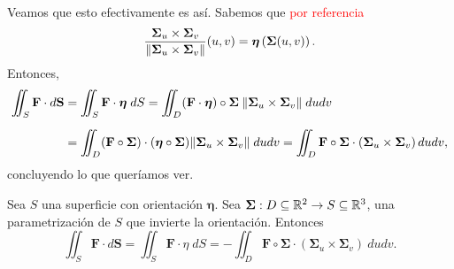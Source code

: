 Veamos que esto efectivamente es as\'i.  Sabemos que \textcolor{red}{por referencia}
\[
    \frac{\boldsymbol{\Sigma}_u\times\boldsymbol{\Sigma}_v}{\norm{\boldsymbol{\Sigma}_u\times\boldsymbol{\Sigma}_v}}(u,v)=\boldsymbol{\eta}\left(\boldsymbol{\Sigma}(u,v)\right).
\]
Entonces,
\begin{align*}
    \iint_S \mathbf{F}\cdot d\mathbf{S}&=\iint_S \mathbf{F}\cdot\boldsymbol{\eta}\;dS=\iint_D (\mathbf{F}\cdot\boldsymbol{\eta})\circ\boldsymbol{\Sigma}\:\norm{\boldsymbol{\Sigma}_u\times\boldsymbol{\Sigma}_v}\;dudv\\[.2cm]
    &=\iint_D (\mathbf{F}\circ\boldsymbol{\Sigma})\cdot(\boldsymbol{\eta}\circ\boldsymbol{\Sigma})\norm{\boldsymbol{\Sigma}_u\times\boldsymbol{\Sigma}_v}\;dudv=\iint_D \mathbf{F}\circ\boldsymbol{\Sigma}\cdot\left(\boldsymbol{\Sigma}_u\times\boldsymbol{\Sigma}_v\right)dudv,
\end{align*} concluyendo lo que quer\'iamos ver.

\begin{obs}
    Sea $S$ una superficie con orientaci\'on $\boldsymbol{\eta}$. Sea $\boldsymbol{\Sigma}:D\subseteq\mathbb{R}^2\to S\subseteq\mathbb{R}^3$, una parametrizaci\'on de $S$ que invierte la orientaci\'on. Entonces
    \[
        \iint_S \mathbf{F}\cdot d\mathbf{S} = \iint_S \mathbf{F}\cdot\eta\;dS=-\iint_D \mathbf{F}\circ\boldsymbol{\Sigma}\cdot(\boldsymbol{\Sigma}_u\times\boldsymbol{\Sigma}_v)\:dudv.
    \]
\end{obs}

